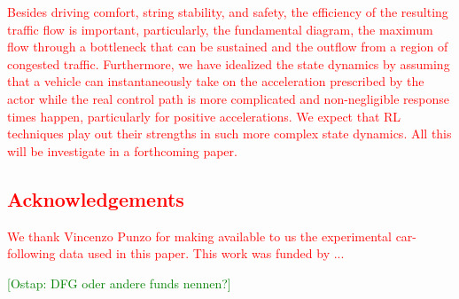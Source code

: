 \documentclass[review]{elsarticle}
\providecommand{\red}[1]{\textcolor{red}{#1}}
\providecommand{\green}[1]{\textcolor{green}{#1}}
\providecommand{\martin}[1]{\red{#1}} %
\providecommand{\martinc}[1]{\green{[#1]}} %
\providecommand{\3}{{\ss}}
\begin{document}
\martin{Besides driving comfort, string stability, and safety,
  the efficiency of the resulting traffic flow is important,
  particularly, the fundamental diagram, the maximum flow through a
  bottleneck that can be 
  sustained and the outflow from a region of congested
  traffic. Furthermore, we have idealized the state dynamics by
  assuming that a vehicle can instantaneously take on the acceleration
  prescribed by the actor while the real control path is more
  complicated and non-negligible response times happen, particularly
  for positive accelerations. We expect that RL techniques play out
  their strengths in such more complex state dynamics. All this  will
  be investigate in a forthcoming paper.
}

\martin{
\subsection*{Acknowledgements}
We thank Vincenzo Punzo for making available to us the experimental
car-following data used in this paper. This work was funded by ...}
\martinc{Ostap: DFG oder andere funds nennen?}






\end{document}
